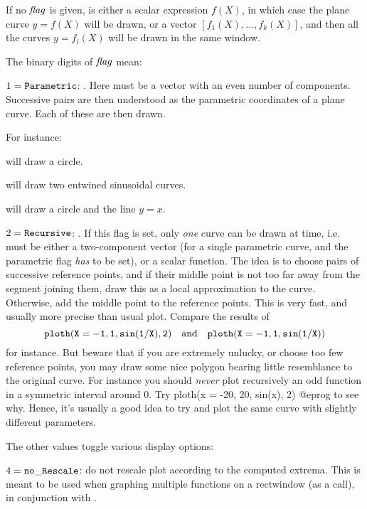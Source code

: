 If no $\hbox{\it f\kern0pt lag\/}$ is given,  is either a scalar expression $f(X)$, in which
case the plane curve $y=f(X)$ will be drawn, or a vector
$[f_1(X),\dots,f_k(X)]$, and then all the curves $y=f_i(X)$ will be drawn in
the same window.

\noindent The binary digits of $\hbox{\it f\kern0pt lag\/}$ mean:

\item $1 = {\tt Parametric}$: . Here  must
be a vector with an even number of components. Successive pairs are then
understood as the parametric coordinates of a plane curve. Each of these are
then drawn.

For instance:

 will draw a circle.

 will draw two entwined sinusoidal
curves.

 will draw a circle and the line
$y=x$.


\item $2 = {\tt Recursive}$: . If this flag is set,
only \emph{one} curve can be drawn at time, i.e.~ must be either a
two-component vector (for a single parametric curve, and the parametric flag
\emph{has} to be set), or a scalar function. The idea is to choose pairs of
successive reference points, and if their middle point is not too far away
from the segment joining them, draw this as a local approximation to the
curve. Otherwise, add the middle point to the reference points. This is very
fast, and usually more precise than usual plot. Compare the results of
$${\tt ploth(X=-1,1,sin(1/X),2)}\quad
 {\rm and}\quad{\tt ploth(X=-1,1,sin(1/X))}$$
for instance. But beware that if you are extremely unlucky, or choose too few
reference points, you may draw some nice polygon bearing little resemblance
to the original curve. For instance you should \emph{never} plot recursively
an odd function in a symmetric interval around 0. Try
\bprog
  ploth(x = -20, 20, sin(x), 2)
@eprog
\noindent to see why. Hence, it's usually a good idea to try and plot the same
curve with slightly different parameters.

The other values toggle various display options:

\item $4 = {\tt no\_Rescale}$: do not rescale plot according to the
computed extrema. This is meant to be used when graphing multiple functions
on a rectwindow (as a  call), in conjunction with
.

